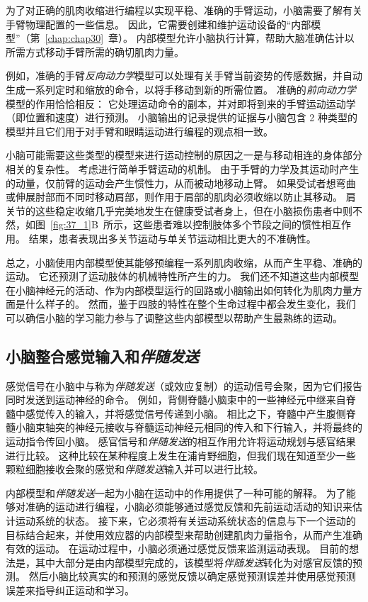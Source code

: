 为了对正确的肌肉收缩进行编程以实现平稳、准确的手臂运动，小脑需要了解有关手臂物理配置的一些信息。
因此，它需要创建和维护运动设备的“内部模型”（第~\ref{chap:chap30}~章）。
内部模型允许小脑执行计算，帮助大脑准确估计以所需方式移动手臂所需的确切肌肉力量。


例如，准确的手臂\textit{反向动力学}模型可以处理有关手臂当前姿势的传感数据，并自动生成一系列定时和缩放的命令，以将手移动到新的所需位置。
准确的\textit{前向动力学}模型的作用恰恰相反：
它处理运动命令的副本，并对即将到来的手臂运动运动学（即位置和速度）进行预测。
小脑输出的记录提供的证据与小脑包含 2 种类型的模型并且它们用于对手臂和眼睛运动进行编程的观点相一致。


小脑可能需要这些类型的模型来进行运动控制的原因之一是与移动相连的身体部分相关的复杂性。
考虑进行简单手臂运动的机制。
由于手臂的力学及其运动时产生的动量，仅前臂的运动会产生惯性力，从而被动地移动上臂。
如果受试者想弯曲或伸展肘部而不同时移动肩部，则作用于肩部的肌肉必须收缩以防止其移动。
肩关节的这些稳定收缩几乎完美地发生在健康受试者身上，但在小脑损伤患者中则不然，如图~\ref{fig:37_1}B~所示，这些患者难以控制肢体多个节段之间的惯性相互作用。
结果，患者表现出多关节运动与单关节运动相比更大的不准确性。


总之，小脑使用内部模型使其能够预编程一系列肌肉收缩，从而产生平稳、准确的运动。
它还预测了运动肢体的机械特性所产生的力。 我们还不知道这些内部模型在小脑神经元的活动、作为内部模型运行的回路或小脑输出如何转化为肌肉力量方面是什么样子的。
然而，鉴于四肢的特性在整个生命过程中都会发生变化，我们可以确信小脑的学习能力参与了调整这些内部模型以帮助产生最熟练的运动。



\subsection{小脑整合感觉输入和\textit{伴随发送}}

感觉信号在小脑中与称为\textit{伴随发送}（或效应复制）的运动信号会聚，因为它们报告同时发送到运动神经的命令。
例如，背侧脊髓小脑束中的一些神经元中继来自脊髓中感觉传入的输入，并将感觉信号传递到小脑。
相比之下，脊髓中产生腹侧脊髓小脑束轴突的神经元接收与脊髓运动神经元相同的传入和下行输入，并将最终的运动指令传回小脑。
感官信号和\textit{伴随发送}的相互作用允许将运动规划与感官结果进行比较。
这种比较在某种程度上发生在浦肯野细胞，但我们现在知道至少一些颗粒细胞接收会聚的感觉和\textit{伴随发送}输入并可以进行比较。


内部模型和\textit{伴随发送}一起为小脑在运动中的作用提供了一种可能的解释。
为了能够对准确的运动进行编程，小脑必须能够通过感觉反馈和先前运动活动的知识来估计运动系统的状态。
接下来，它必须将有关运动系统状态的信息与下一个运动的目标结合起来，并使用效应器的内部模型来帮助创建肌肉力量指令，从而产生准确有效的运动。
在运动过程中，小脑必须通过感觉反馈来监测运动表现。
目前的想法是，其中大部分是由内部模型完成的，该模型将\textit{伴随发送}转化为对感官反馈的预测。
然后小脑比较真实的和预测的感觉反馈以确定感觉预测误差并使用感觉预测误差来指导纠正运动和学习。


